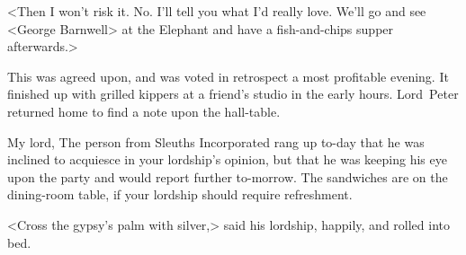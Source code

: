 <Then I won't risk it. No. I'll tell you what I'd really love. We'll go and see <George Barnwell> at the Elephant and have a fish-and-chips supper afterwards.>

This was agreed upon, and was voted in retrospect a most profitable evening. It finished up with grilled kippers at a friend's studio in the early hours. Lord~Peter returned home to find a note upon the hall-table.

\begin{mail}{}{My lord,}
	The person from Sleuths Incorporated rang up to-day that he was inclined to acquiesce in your lordship's opinion, but that he was keeping his eye upon the party and would report further to-morrow. The sandwiches are on the dining-room table, if your lordship should require refreshment.
\end{mail}


<Cross the gypsy's palm with silver,> said his lordship, happily, and rolled into bed.